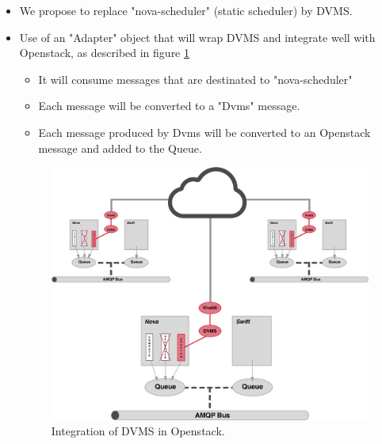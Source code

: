 \begin{itemize}

\item We propose to replace "nova-scheduler" (static scheduler) by DVMS.

\item Use of an "Adapter" object that will wrap DVMS and integrate well with Openstack, as described in figure \ref{fig:integration}
	\begin{itemize}
		\item It will consume messages that are destinated to "nova-scheduler"

		\item Each message will be converted to a "Dvms" message.
		
		\item Each message produced by Dvms will be converted to an Openstack message and added to the Queue.

	\end{itemize}

\begin{figure}
	\centering
	\includegraphics[width=0.75\linewidth]{Figures/openstack_dvms.pdf}
	\caption{Integration of DVMS in Openstack.}%
	\label{fig:integration}%
\end{figure}

\end{itemize}